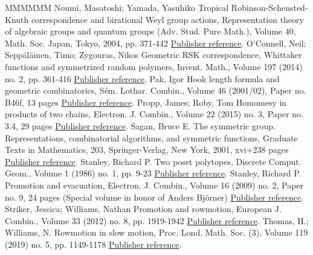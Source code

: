 \begin{thebibliography}{MMMMMM}
 Noumi, Masatoshi; Yamada, Yasuhiko Tropical Robinson-Schensted-Knuth correspondence and birational Weyl group actions, Representation theory of algebraic groups and quantum groups (Adv. Stud. Pure Math.), Volume 40, Math. Soc. Japan, Tokyo, 2004, pp. 371-442 \href{https://alco.centre-mersenne.org/articles/10.5802/alco.385/#noumiyamada}{Publisher reference}.
 O’Connell, Neil; Seppäläinen, Timo; Zygouras, Nikos Geometric RSK correspondence, Whittaker functions and symmetrized random polymers, Invent. Math., Volume 197 (2014) no. 2, pp. 361-416 \href{https://alco.centre-mersenne.org/articles/10.5802/alco.385/#osz}{Publisher reference}.
 Pak, Igor Hook length formula and geometric combinatorics, Sém. Lothar. Combin., Volume 46 (2001/02), Paper no. B46f, 13 pages \href{https://alco.centre-mersenne.org/articles/10.5802/alco.385/#pak}{Publisher reference}.
 Propp, James; Roby, Tom Homomesy in products of two chains, Electron. J. Combin., Volume 22 (2015) no. 3, Paper no. 3.4, 29 pages \href{https://alco.centre-mersenne.org/articles/10.5802/alco.385/#propproby}{Publisher reference}.
 Sagan, Bruce E. The symmetric group. Representations, combinatorial algorithms, and symmetric functions, Graduate Texts in Mathematics, 203, Springer-Verlag, New York, 2001, xvi+238 pages \href{https://alco.centre-mersenne.org/articles/10.5802/alco.385/#sagan}{Publisher reference}.
 Stanley, Richard P. Two poset polytopes, Discrete Comput. Geom., Volume 1 (1986) no. 1, pp. 9-23 \href{https://alco.centre-mersenne.org/articles/10.5802/alco.385/#stanley2}{Publisher reference}.
 Stanley, Richard P. Promotion and evacuation, Electron. J. Combin., Volume 16 (2009) no. 2, Paper no. 9, 24 pages (Special volume in honor of Anders Björner) \href{https://alco.centre-mersenne.org/articles/10.5802/alco.385/#stanley1}{Publisher reference}.
 Striker, Jessica; Williams, Nathan Promotion and rowmotion, European J. Combin., Volume 33 (2012) no. 8, pp. 1919-1942 \href{https://alco.centre-mersenne.org/articles/10.5802/alco.385/#strikerwilliams}{Publisher reference}.
 Thomas, H.; Williams, N. Rowmotion in slow motion, Proc. Lond. Math. Soc. (3), Volume 119 (2019) no. 5, pp. 1149-1178 \href{https://alco.centre-mersenne.org/articles/10.5802/alco.385/#thomaswilliams}{Publisher reference}.
\end{thebibliography}
